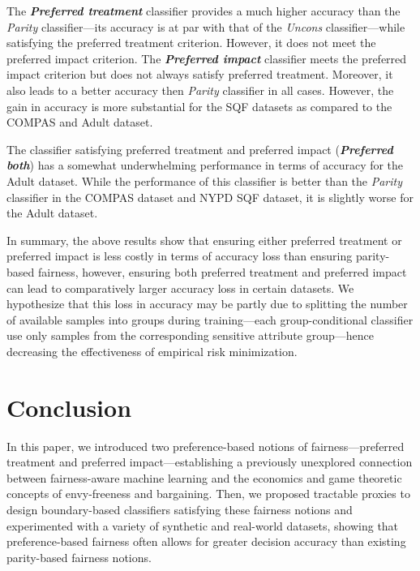 \documentclass{article}
\newcommand{\emphb}[1]{\textbf{\emph{#1}}}
\begin{document}
The \emphb{Preferred treatment} classifier provides a much higher accuracy than the \emph{Parity} classifier---its accuracy is at par with that of the \emph{Uncons} classifier---while satisfying the
preferred treatment criterion. However, it does not meet the preferred impact criterion.
The \emphb{Preferred impact} classifier meets the preferred impact criterion but does not always satisfy preferred treatment. Moreover, it also leads to a better accuracy then \emph{Parity} classifier in
all cases. However, the gain in accuracy is more substantial for the SQF datasets as compared to the COMPAS and Adult dataset.


The classifier satisfying preferred treatment and preferred impact (\emphb{Preferred both}) has a somewhat underwhelming performance in terms of accuracy for the Adult dataset. While the performance of this classifier is better than the
\emph{Parity} classifier in the COMPAS dataset and NYPD SQF dataset, it is slightly worse for the Adult dataset.


In summary, the above results show that ensuring either preferred treatment or preferred impact is less costly in terms of accuracy loss than ensuring parity-based fairness, however,
ensuring both preferred treatment and preferred impact can lead to comparatively larger accuracy loss in certain datasets. We hypothesize that this loss in accuracy may be partly due to splitting the number of available
samples into groups during training---each group-conditional classifier use only samples from the corresponding sensitive attribute group---hence decreasing the effectiveness of empirical risk minimization.








\vspace{-3mm}
\section{Conclusion}
\vspace{-3mm}

In this paper, we introduced two preference-based notions of fairness---preferred treatment and preferred impact---establishing a previously unexplored
connection between fairness-aware machine learning and the economics and game theoretic concepts of envy-freeness and bargaining.
Then, we proposed tractable proxies to design boundary-based classifiers satisfying these fairness notions and experimented with a variety
of synthetic and real-world datasets, showing that preference-based fairness often allows for greater decision accuracy than existing parity-based
fairness notions.
\end{document}
